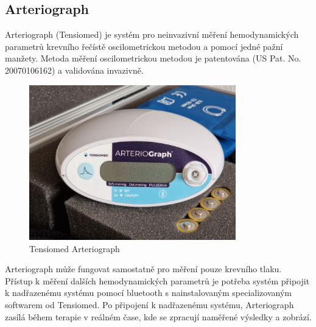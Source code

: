 \subsection{Arteriograph}
Arteriograph (Tensiomed) je systém pro neinvazivní měření hemodynamických parametrů krevního řečístě oscilometrickou metodou a pomocí jedné pažní manžety.
Metoda měření oscilometrickou metodou je patentována (US Pat. No. 20070106162) a validována invazivně.
\begin{figure}[H]
    \caption{Tensiomed Arteriograph \cite{cite:Arteriograph}}
    \includegraphics[width=0.8\textwidth]{pictures/arteriograph.jpg}
\end{figure}
Arteriograph může fungovat samostatně pro měření pouze krevního tlaku. Přístup k měření dalších hemodynamických parametrů je potřeba systém připojit k nadřazenému systému pomocí bluetooth s nainstalovaným specializovaným softwarem od Tensiomed.
Po připojení k nadřazenému systému, Arteriograph zasílá během terapie v reálném čase, kde se zpracují naměřené výsledky a zobrází.
\cite{cite:Arteriograph}

